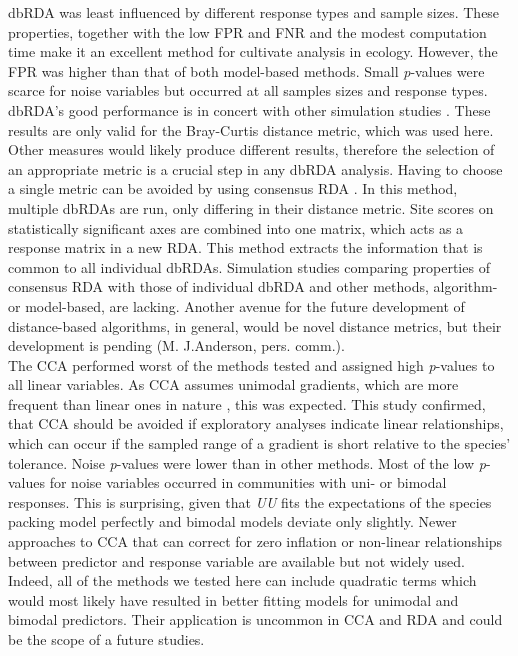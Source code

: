 \documentclass[a4paper,11pt]{article}
\begin{document}
    dbRDA was least influenced by different response types and sample sizes. 
    These properties, together with the low FPR and FNR and the modest computation time make it an excellent method for cultivate analysis in ecology.
	However, the FPR was higher than that of both model-based methods.
	Small \textit{p}-values were scarce for noise variables but occurred at all samples sizes and response types. 
	dbRDA's good performance is in concert with other simulation studies \cite[e.g.][]{Roberts2009}.
	These results are only valid for the Bray-Curtis distance metric, which was used here.
	Other measures would likely produce different results, 
	therefore the selection of an appropriate metric is a crucial step in any dbRDA analysis.
	Having to choose a single metric can be avoided by using consensus RDA \citep{Blanchet2014}.
	In this method, multiple dbRDAs are run, only differing in their distance metric. 
	Site scores on statistically significant axes are combined into one matrix, which acts as a response matrix in a new RDA. 
	This method extracts the information that is common to all individual dbRDAs.
	Simulation studies comparing properties of consensus RDA with those of individual dbRDA and other methods, algorithm- or model-based, are lacking.
	Another avenue for the future development of distance-based algorithms, in general, would be novel distance metrics, but their development is pending (M. J.Anderson, pers. comm.).\\


	The CCA performed worst of the methods tested and assigned high \textit{p}-values to all linear variables.
	As CCA assumes unimodal gradients, which are more frequent than linear ones in nature \citep{Oksanen2002}, this was expected.  
	This study confirmed, that CCA should be avoided if exploratory analyses indicate linear relationships, which can occur if the sampled range of a gradient is short relative to the species' tolerance. 
	Noise \textit{p}-values were lower than in other methods.
	Most of the low \textit{p}-values for noise variables occurred in communities with uni- or bimodal responses. 
	This is surprising, given that \textit{UU} fits the expectations of the species packing model perfectly and bimodal models deviate only slightly.
	Newer approaches to CCA that can correct for zero inflation \citep{Zhang2012} or non-linear relationships between predictor and response variable \citep{Makarenkov2002} are available but not widely used. 
	Indeed, all of the methods we tested here can include quadratic terms which would most likely have resulted in better fitting models for unimodal and bimodal predictors. 
	Their application is uncommon in CCA and RDA and could be the scope of a future studies.
\end{document}
